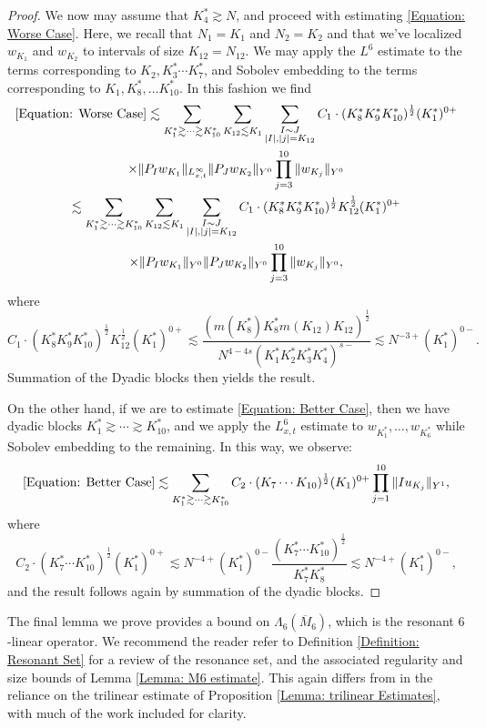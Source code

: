 \documentclass[12pt, letterpaper]{amsart}
\begin{document}
\begin{proof}
    We now may assume that $K_4^*\gtrsim N$, and proceed with estimating \eqref{Equation: Worse Case}. Here, we recall that $N_1 = K_1$ and $N_2 = K_{2}$ and that we've localized $w_{K_1}$ and $w_{K_2}$ to intervals of size $K_{12} = N_{12}$. We may apply the $L^6$ estimate to the terms corresponding to $K_2, K_3^*\cdots K_7^*$, and Sobolev embedding to the terms corresponding to $K_1, K_8^*,\dots K_{10}^*$. In this fashion we find
    \begin{multline}\label{Equation: Worst case expanded}
    \eqref{Equation: Worse Case}\lesssim \sum_{K_1^*\gtrsim \cdots \gtrsim K_{10}^*}\sum_{K_{12}\lesssim K_1}\sum_{\substack{I\sim J\\ |I|,|j|=K_{12}}}C_1\cdot(K_8^*K_9^*K_{10}^*)^{\frac12}(K_1^*)^{0+}\\
    \times \|P_{I}w_{K_1}\|_{L^\infty_{x,t}}\|P_{J}w_{K_2}\|_{Y^0}\prod_{j=3}^{10}\|w_{K_j}\|_{Y^0}\\
    \lesssim \sum_{K_1^*\gtrsim \cdots \gtrsim K_{10}^*}\sum_{K_{12}\lesssim K_1}\sum_{\substack{I\sim J\\ |I|,|j|=K_{12}}}C_1\cdot(K_8^*K_9^*K_{10}^*)^{\frac12}K_{12}^{\frac12}(K_1^*)^{0+}\\
    \times \|P_{I}w_{K_1}\|_{Y^0}\|P_{J}w_{K_2}\|_{Y^0}\prod_{j=3}^{10}\|w_{K_j}\|_{Y^0},
    \end{multline}
    where
    \[
C_1\cdot(K_8^*K_9^*K_{10}^*)^{\frac12}K_{12}^{\frac12}(K_1^*)^{0+}\lesssim \frac{(m(K_8^*)K_8^*m(K_{12})K_{12})^{\frac12}}{N^{4-4s}(K_1^*K_2^*K_3^*K_4^*)^{s-}}\lesssim N^{-3+}(K_1^*)^{0-}.
    \]
    Summation of the Dyadic blocks then yields the result.
    
    
    On the other hand, if we are to estimate \eqref{Equation: Better Case}, then we have dyadic blocks $K_1^*\gtrsim \cdots \gtrsim K_{10}^*$, and we apply the $L^6_{x,t}$ estimate to $w_{K_1^*},\dots, w_{K_6^*}$ while Sobolev embedding to the remaining. In this way, we observe:
    \[
        \eqref{Equation: Better Case}\lesssim \sum_{K_1^*\gtrsim \cdots \gtrsim K_{10}^*}C_2\cdot(K_7\cdots K_{10})^{\frac12}(K_1)^{0+}\prod_{j=1}^{10}\|Iu_{K_j}\|_{Y^1},
    \]
    where
    \[
C_2\cdot(K_7^*\cdots K_{10}^*)^{\frac12}(K_1^*)^{0+}\lesssim N^{-4+}(K_1^*)^{0-}\frac{(K_7^*\cdots K_{10}^*)^{\frac12}}{K_7^*K_8^*}\lesssim N^{-4+}(K_1^*)^{0-},
    \]
    and the result follows again by summation of the dyadic blocks.
\end{proof}
The final lemma we prove provides a bound on $\Lambda_6(\overline{M}_6)$, which is the resonant $6$-linear operator. We recommend the reader refer to Definition \ref{Definition: Resonant Set} for a review of the resonance set, and the associated regularity and size bounds of Lemma \ref{Lemma: M6 estimate}. This again differs from \cite[Proposition 5.7]{schippa2024improved} in the reliance on the trilinear estimate of Proposition \ref{Lemma: trilinear Estimates}, with much of the work included for clarity.
\end{document}
